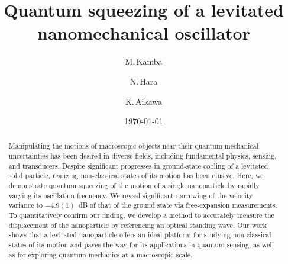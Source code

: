 \documentclass[aps, prl, 
amsmath, showpacs, preprintnumbers, twocolumn, amssymb, amsmath, superscriptaddress]{revtex4-1}
\begin{document}
\title{Quantum squeezing of a levitated nanomechanical oscillator}
\author{M.\,Kamba}
\author{N.\,Hara}
\author{K.\,Aikawa}


\date{\today}

\pacs{}

\begin{abstract}
Manipulating the motions of macroscopic objects near their quantum mechanical uncertainties has been desired in diverse fields, including fundamental physics, sensing, and transducers. Despite significant progresses in ground-state cooling of a levitated solid particle, realizing non-classical states of its motion has been elusive. Here, we demonstrate quantum squeezing of the motion of a single nanoparticle by rapidly varying its oscillation frequency. We reveal significant narrowing of the velocity variance to $-4.9(1)$~dB of that of the ground state via free-expansion measurements. To quantitatively confirm our finding, we develop a method to accurately measure the displacement of the nanoparticle by referencing an optical standing wave. Our work shows that a levitated nanoparticle offers an ideal platform for studying non-classical states of its motion and paves the way for its applications in quantum sensing, as well as for exploring quantum mechanics at a macroscopic scale.
\end{abstract}

\maketitle

\end{document}
